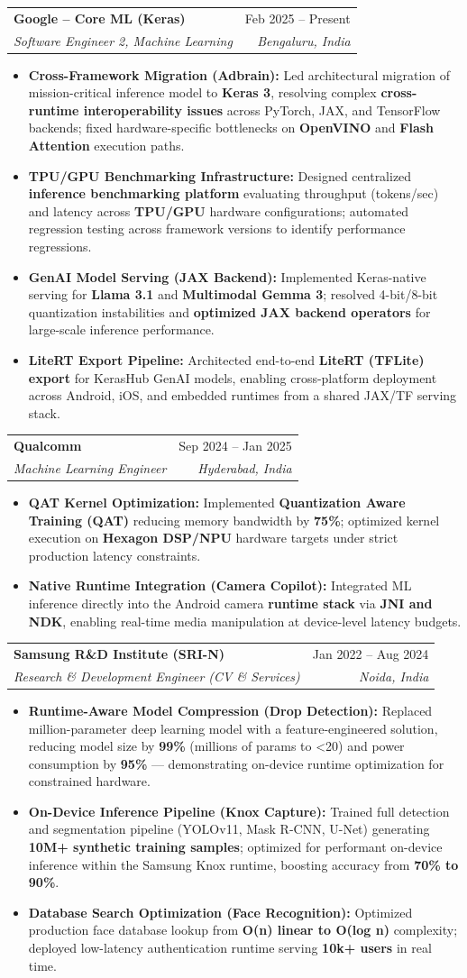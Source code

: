 \documentclass[10pt, letterpaper]{article}
\makeatletter
\newcommand{\resumeItem}[1]{
  \item\small{
    {#1 \vspace{-2pt}}
  }
}
\newcommand{\resumeSubheading}[4]{
  \vspace{-1pt}\item
    \begin{tabular*}{0.98\textwidth}[t]{l@{\extracolsep{\fill}}r}
      \textbf{#1} & {\small\color{darkgray} #2} \\
      \textit{\small#3} & \textit{\small\color{darkgray} #4} \\
    \end{tabular*}\vspace{-7pt}
}
\newcommand{\resumeItemListStart}{\begin{itemize}}
\newcommand{\resumeItemListEnd}{\end{itemize}\vspace{-5pt}}
\makeatother
\begin{document}
    \resumeSubheading
      {Google -- Core ML (Keras)}{Feb 2025 -- Present}
      {Software Engineer 2, Machine Learning}{Bengaluru, India}
      \resumeItemListStart
        \resumeItem{\textbf{Cross-Framework Migration (Adbrain):} Led architectural migration of mission-critical inference model to \textbf{Keras 3}, resolving complex \textbf{cross-runtime interoperability issues} across PyTorch, JAX, and TensorFlow backends; fixed hardware-specific bottlenecks on \textbf{OpenVINO} and \textbf{Flash Attention} execution paths.}
        \resumeItem{\textbf{TPU/GPU Benchmarking Infrastructure:} Designed centralized \textbf{inference benchmarking platform} evaluating throughput (tokens/sec) and latency across \textbf{TPU/GPU} hardware configurations; automated regression testing across framework versions to identify performance regressions.}
        \resumeItem{\textbf{GenAI Model Serving (JAX Backend):} Implemented Keras-native serving for \textbf{Llama 3.1} and \textbf{Multimodal Gemma 3}; resolved 4-bit/8-bit quantization instabilities and \textbf{optimized JAX backend operators} for large-scale inference performance.}
        \resumeItem{\textbf{LiteRT Export Pipeline:} Architected end-to-end \textbf{LiteRT (TFLite) export} for KerasHub GenAI models, enabling cross-platform deployment across Android, iOS, and embedded runtimes from a shared JAX/TF serving stack.}
      \resumeItemListEnd

    \resumeSubheading
      {Qualcomm}{Sep 2024 -- Jan 2025}
      {Machine Learning Engineer}{Hyderabad, India}
      \resumeItemListStart
        \resumeItem{\textbf{QAT Kernel Optimization:} Implemented \textbf{Quantization Aware Training (QAT)} reducing memory bandwidth by \textbf{75\%}; optimized kernel execution on \textbf{Hexagon DSP/NPU} hardware targets under strict production latency constraints.}
        \resumeItem{\textbf{Native Runtime Integration (Camera Copilot):} Integrated ML inference directly into the Android camera \textbf{runtime stack} via \textbf{JNI and NDK}, enabling real-time media manipulation at device-level latency budgets.}
      \resumeItemListEnd

    \resumeSubheading
      {Samsung R\&D Institute (SRI-N)}{Jan 2022 -- Aug 2024}
      {Research \& Development Engineer (CV \& Services)}{Noida, India}
      \resumeItemListStart
        \resumeItem{\textbf{Runtime-Aware Model Compression (Drop Detection):} Replaced million-parameter deep learning model with a feature-engineered solution, reducing model size by \textbf{99\%} (millions of params to \textless{}20) and power consumption by \textbf{95\%} — demonstrating on-device runtime optimization for constrained hardware.}
        \resumeItem{\textbf{On-Device Inference Pipeline (Knox Capture):} Trained full detection and segmentation pipeline (YOLOv11, Mask R-CNN, U-Net) generating \textbf{10M+ synthetic training samples}; optimized for performant on-device inference within the Samsung Knox runtime, boosting accuracy from \textbf{70\% to 90\%}.}
        \resumeItem{\textbf{Database Search Optimization (Face Recognition):} Optimized production face database lookup from \textbf{O(n) linear to O(log n)} complexity; deployed low-latency authentication runtime serving \textbf{10k+ users} in real time.}
      \resumeItemListEnd
\end{document}
